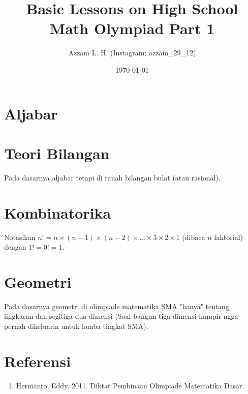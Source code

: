 \title{Basic Lessons on High School Math Olympiad Part 1}
\date{\today}
\author{Azzam L. H. (Instagram: azzam\_29\_12)}
\maketitle
\renewcommand*\contentsname{Daftar Isi}
\tableofcontents
\newpage

\section{Aljabar}





\newpage
\section{Teori Bilangan}
Pada dasarnya aljabar tetapi di ranah bilangan bulat (atau rasional).








        
\newpage    
\section{Kombinatorika}
Notasikan $n!=n \times (n-1) \times (n-2) \times \dots \times 3 \times 2 \times 1$ (dibaca $n$ faktorial) dengan $1!=0!=1$.









\newpage
\section{Geometri}
Pada dasarnya geometri di olimpiade matematika SMA "hanya" tentang lingkaran dan segitiga dua dimensi (Soal bangun tiga dimensi hampir ngga pernah dikeluarin untuk lomba tingkat SMA).







\section{Referensi}
\begin{enumerate}
\item Hermanto, Eddy. 2011. Diktat Pembinaan Olimpiade Matematika Dasar.
\end{enumerate}
